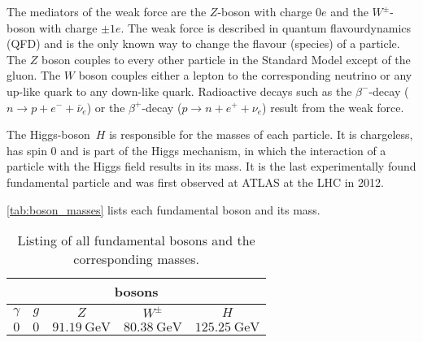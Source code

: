 The mediators of the weak force are the $Z$-boson with charge $0e$ and the $W^\pm$-boson with charge $\pm 1e$.
The weak force is described in quantum flavourdynamics (QFD) and is the only known way to change the flavour (species) of a particle.
The $Z$ boson couples to every other particle in the Standard Model except of the gluon.
The $W$ boson couples either a lepton to the corresponding neutrino or any up-like quark to any down-like quark.
Radioactive decays such as the $\beta^-$-decay ($n \rightarrow p + e^- + \bar{\nu}_e$) or the $\beta^+$-decay ($p \rightarrow n + e^+ + \nu_e$) result from the weak force.

The Higgs-boson~$H$ is responsible for the masses of each particle.
It is chargeless, has spin $0$ and is part of the Higgs mechanism, in which the interaction of a particle with the Higgs field results in its mass.
It is the last experimentally found fundamental particle and was first observed at ATLAS at the LHC in 2012.

\autoref{tab:boson_masses} lists each fundamental boson and its mass.

\begin{table}
    \centering
    \caption{Listing of all fundamental bosons and the corresponding masses. \cite{pdg}}
    \begin{tabular}{c c c c c}
        \toprule
        \multicolumn{5}{c}{bosons} \\
        \midrule
        $\gamma$ & $g$ & $Z$ & $W^\pm$ & $H$ \\
        $0$ & $0$ & $\qty{91.19}{\giga\eV}$ & $\qty{80.38}{\giga\eV}$ & $\qty{125.25}{\giga\eV}$ \\
        \bottomrule
    \end{tabular}
    \label{tab:boson_masses}
\end{table}

%